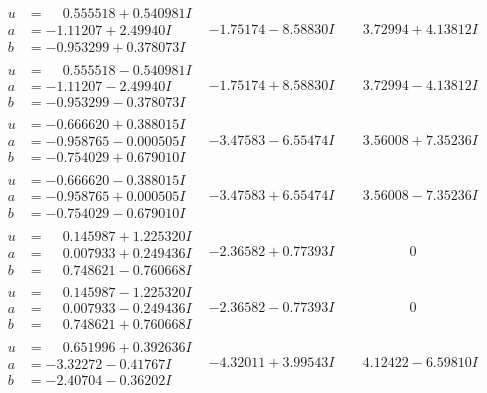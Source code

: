 \documentclass[1p]{elsarticle_modified}
\theoremstyle{definition}
\begin{document}
$$\begin{array}{c|c|c}
\begin{aligned}
u &= \phantom{-}0.555518 + 0.540981 I \\
a &= -1.11207 + 2.49940 I \\
b &= -0.953299 + 0.378073 I\end{aligned}
 & -1.75174 - 8.58830 I & \phantom{-}3.72994 + 4.13812 I \\ \hline\begin{aligned}
u &= \phantom{-}0.555518 - 0.540981 I \\
a &= -1.11207 - 2.49940 I \\
b &= -0.953299 - 0.378073 I\end{aligned}
 & -1.75174 + 8.58830 I & \phantom{-}3.72994 - 4.13812 I \\ \hline\begin{aligned}
u &= -0.666620 + 0.388015 I \\
a &= -0.958765 - 0.000505 I \\
b &= -0.754029 + 0.679010 I\end{aligned}
 & -3.47583 - 6.55474 I & \phantom{-}3.56008 + 7.35236 I \\ \hline\begin{aligned}
u &= -0.666620 - 0.388015 I \\
a &= -0.958765 + 0.000505 I \\
b &= -0.754029 - 0.679010 I\end{aligned}
 & -3.47583 + 6.55474 I & \phantom{-}3.56008 - 7.35236 I \\ \hline\begin{aligned}
u &= \phantom{-}0.145987 + 1.225320 I \\
a &= \phantom{-}0.007933 + 0.249436 I \\
b &= \phantom{-}0.748621 - 0.760668 I\end{aligned}
 & -2.36582 + 0.77393 I & \phantom{-0.000000 } 0 \\ \hline\begin{aligned}
u &= \phantom{-}0.145987 - 1.225320 I \\
a &= \phantom{-}0.007933 - 0.249436 I \\
b &= \phantom{-}0.748621 + 0.760668 I\end{aligned}
 & -2.36582 - 0.77393 I & \phantom{-0.000000 } 0 \\ \hline\begin{aligned}
u &= \phantom{-}0.651996 + 0.392636 I \\
a &= -3.32272 - 0.41767 I \\
b &= -2.40704 - 0.36202 I\end{aligned}
 & -4.32011 + 3.99543 I & \phantom{-}4.12422 - 6.59810 I \\ \hline\begin{aligned}

\end{aligned}
\end{array}$$
\end{document}
